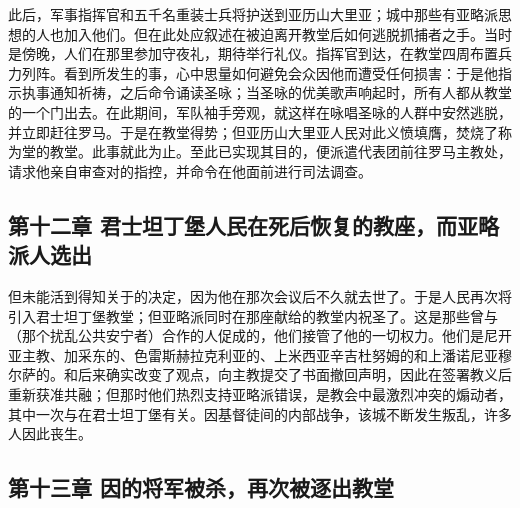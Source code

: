此后，军事指挥官和五千名重装士兵将护送到亚历山大里亚；城中那些有亚略派思想的人也加入他们。但在此处应叙述在被迫离开教堂后如何逃脱抓捕者之手。当时是傍晚，人们在那里参加守夜礼，期待举行礼仪。指挥官到达，在教堂四周布置兵力列阵。看到所发生的事，心中思量如何避免会众因他而遭受任何损害：于是他指示执事通知祈祷，之后命令诵读圣咏；当圣咏的优美歌声响起时，所有人都从教堂的一个门出去。在此期间，军队袖手旁观，就这样在咏唱圣咏的人群中安然逃脱，并立即赶往罗马。于是在教堂得势；但亚历山大里亚人民对此义愤填膺，焚烧了称为堂的教堂。此事就此为止。至此已实现其目的，便派遣代表团前往罗马主教处，请求他亲自审查对的指控，并命令在他面前进行司法调查。\par


\subsection{第十二章  君士坦丁堡人民在死后恢复的教座，而亚略派人选出}

但未能活到得知关于的决定，因为他在那次会议后不久就去世了。于是人民再次将引入君士坦丁堡教堂；但亚略派同时在那座献给的教堂内祝圣了。这是那些曾与（那个扰乱公共安宁者）合作的人促成的，他们接管了他的一切权力。他们是尼开亚主教、加采东的、色雷斯赫拉克利亚的、上米西亚辛吉杜努姆的和上潘诺尼亚穆尔萨的。和后来确实改变了观点，向主教提交了书面撤回声明，因此在签署教义后重新获准共融；但那时他们热烈支持亚略派错误，是教会中最激烈冲突的煽动者，其中一次与在君士坦丁堡有关。因基督徒间的内部战争，该城不断发生叛乱，许多人因此丧生。\par


\subsection{第十三章  因的将军被杀，再次被逐出教堂}

